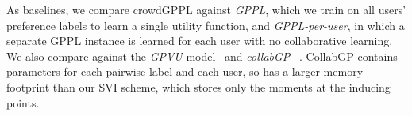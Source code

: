 


As baselines, we compare crowdGPPL against 
\emph{GPPL},
which we train on all users' preference labels to learn a single utility function,
and \emph{GPPL-per-user},
in which a separate GPPL instance is learned for each user with no collaborative
learning.
We also compare against the \emph{GPVU} model~\citep{khan2014scalable} 
and 
\emph{collabGP} ~\citep{houlsby2012collaborative}.
CollabGP contains parameters for each pairwise label and
 each user, so has a larger memory footprint than our SVI scheme, 
which stores only the moments at the inducing points.

